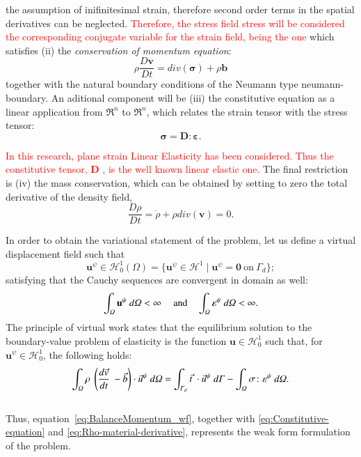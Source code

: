 \documentclass[preprint,12pt,a4paper]{elsarticle}
\newcommand{\vect}[1]{
  \ensuremath{\mathbf{{#1}}}
}
\newcommand{\tens}[1]{
  \ensuremath{\mathbf{{#1}}}
}
\newcommand{\red}[1]{
  \textcolor{red}{{#1}}
}
\newcommand{\Div}[1]{
  \ensuremath{div({#1})}
}
\newcommand{\Integral}[2]{
  \IfStrEqCase{#1}{
    {2}{\ensuremath{\int_{\varGamma_d}{#2}\ d\varGamma}}
    {3}{\ensuremath{\int_{\varOmega}{#2}\ d\varOmega}}
  }
}
\begin{document}
the assumption of inifinitesimal strain, therefore second order terms
in the spatial derivatives can be neglected. \red{Therefore, the stress field \gls{stress} will be considered the corresponding conjugate variable for the strain field, being the one} which satisfies (ii) the \textit{conservation of
  momentum equation}:
\begin{equation}
  \label{eq:Balance-momentum}
\rho \frac{D\vect{v}}{Dt} = \Div{\tens{\sigma}} + \rho \vect{b}
\end{equation}
together with the natural boundary conditions of the Neumann type \gls{neumann-boundary}.  An aditional component will be (iii) the constitutive equation as a linear
application from $\Re^n$ to $\Re^n$, which relates the
strain tensor with the stress tensor:
\begin{equation}
  \label{eq:Constitutive-equation}
\tens{\sigma} = \tens{D} \colon \tens{\varepsilon}.
\end{equation}
\red{In this research, plane strain Linear Elasticity has been considered. Thus the constitutive tensor, \tens{D}, is the well known linear elastic one.} The final restriction is (iv) the mass conservation, which can be obtained by
setting to zero the total derivative of the density field,
\begin{equation}
  \label{eq:Rho-material-derivative}
  \frac{D \rho}{D t} = \dot{\rho} + \rho \Div{\vect{v}} = 0.
\end{equation}

In order to obtain the variational statement of the problem, let us define a
virtual displacement field such that
\begin{equation}
  \label{eq:Hilbert-space}
  \vect{u}^{\psi} \in \mathcal{H}^1_0(\Omega) = \{ \vect{u}^{\psi} \in
  \mathcal{H}^1 \mid \vect{u}^{\psi} = \vect{0}\ \text{on}\ \Gamma_d \};
\end{equation}
satisfying that the Cauchy sequences are convergent in \gls{domain} as well:
\begin{equation}
  \label{eq:cauchy-secuence}
  \Integral{3}{\vect{u}^{\psi}} < \infty\ \quad\text{and}\quad
  \Integral{3}{\tens{\varepsilon}^{\psi}} < \infty.
\end{equation}
The principle of virtual work states that the equilibrium solution to
the boundary-value problem of elasticity is the function $\vect{u} \in
\mathcal{H}^1_0$ such that, for $\vect{u}^{\psi} \in
\mathcal{H}^1_0$, the following holds:
\begin{equation}
  \label{eq:BalanceMomentum_wf}
  \Integral{3}{\rho\ \left( \frac{d\vec{v}}{dt}\ - \vec{b} \right) \cdot \vec{u}^{\psi}} =
  \Integral{2}{\vec{t}\ \cdot \vec{u}^{\psi}} - \Integral{3}{\tens{\sigma} \colon
   \tens{\varepsilon}^{\psi}}.
\end{equation}\\
Thus, equation~\eqref{eq:BalanceMomentum_wf}, together with
\eqref{eq:Constitutive-equation} and
\eqref{eq:Rho-material-derivative}, represents the weak form
formulation of the problem.
\end{document}
